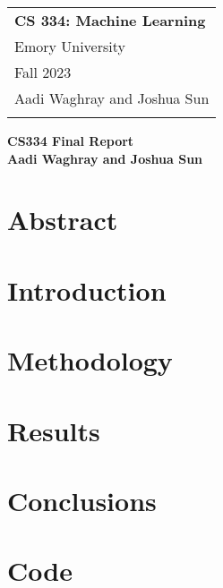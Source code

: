 \documentclass[12pt]{article}
\begin{document}
\thispagestyle{empty}

\begin{tabular}{p{10.5cm}}
    {\large \bf CS 334: Machine Learning} \\
    Emory University                      \\ Fall 2023  \\ Aadi Waghray and Joshua Sun\\
    \bottomrule
    \\
\end{tabular}

\vspace*{0.3cm}

\begin{center}
    {\Large \bf CS334 Final Report }\\ %
    \vspace*{0.02cm}
    {\bf Aadi Waghray and Joshua Sun}
\end{center}

\vspace{0.4cm}
\section*{Abstract}

\section*{Introduction}

\section*{Methodology}

\section*{Results}

\section*{Conclusions}

\section*{Code}

\newpage
\nocite{*}
\printbibliography
\end{document}

